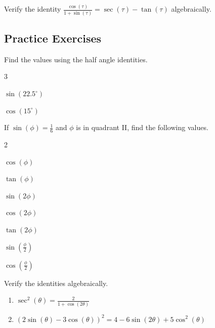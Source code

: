 \begin{myPrep}
	Verify the identity $\frac{\cos(\tau)}{1+\sin(\tau)}=\sec(\tau)-\tan(\tau)$ algebraically.
\end{myPrep}
\vspace{6cm}

\newpage

\subsection*{Practice Exercises} \label{practice-exercises-section-double-angle-identities}

\begin{myPractice}
	Find the values using the half angle identities.
	\begin{enumerate}
	\end{enumerate}
\end{myPractice}
\vfill

\begin{myPractice}
	If $\sin(\phi)=\frac{1}{6}$ and $\phi$ is in quadrant II, find the following values.
	\begin{enumerate}[itemsep=3cm]
		\begin{multicols}{2}
		\item $\cos(\phi)$
		\item $\tan(\phi)$
		\item $\sin(2\phi)$
		\item $\cos(2\phi)$
		\item $\tan(2\phi)$
		\item $\sin(\frac{\phi}{2})$
		\item $\cos(\frac{\phi}{2})$
		\end{multicols}
	\end{enumerate}
\end{myPractice}
\vfill
\newpage

\begin{myPractice}
	Verify the identities algebraically.
	\begin{enumerate}
		\item $\sec^2(\theta)=\frac{2}{1+\cos(2\theta)}$
		\vfill
		\vfill
		\item $\left(2\sin(\theta)-3\cos(\theta)\right)^2=4-6\sin(2\theta)+5\cos^2(\theta)$
		\vfill
		\vfill
	\end{enumerate}
\end{myPractice}

